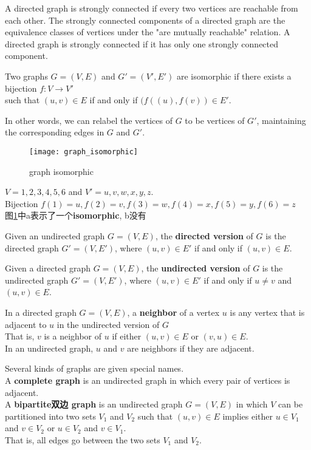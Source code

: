 \documentclass{article}
\begin{document}
A directed graph is strongly connected if every two vertices are reachable from each other. The strongly connected components of a directed graph are the equivalence classes of vertices under the "are mutually reachable" relation. A directed graph is strongly connected if it has only one strongly connected component.

Two graphs $G = (V, E)$ and $G' = (V', E')$ are isomorphic if there exists a bijection $f : V \rightarrow V'$ \\
such that $(u, v) \in E$ if and only if $(f((u), f(v)) \in E'$.

In other words, we can relabel the vertices of $G$ to be vertices of $G'$, maintaining the corresponding edges in $G$ and $G'$.

\begin{figure}[htbp]
   \centering
   \texttt{[image: graph\_isomorphic]}\\
   \caption{graph isomorphic}\label{fig.graph.isomorphic}
 \end{figure}

$V = {1, 2, 3, 4, 5, 6}$ and $V' = {u, v, w, x, y, z}$. \\
Bijection $f(1) = u, f(2) = v, f(3) = w, f(4) = x, f(5) = y, f(6) = z$\\
图\ref{fig.graph.isomorphic}中a表示了一个\textbf{isomorphic}, b没有

\bigskip
Given an undirected graph $G = (V, E)$, the \textbf{directed version} of $G$ is the directed graph $G' = (V, E')$, where $(u, v) \in E'$ if and only if $(u, v) \in E$.

Given a directed graph $G = (V, E)$, the \textbf{undirected version} of $G$ is the undirected graph $G'= (V, E')$, where $(u, v) \in E'$ if and only if $u \neq v$ and $(u, v) \in E$.

In a directed graph $G = (V, E)$, a \textbf{neighbor} of a vertex $u$ is any vertex that is adjacent to $u$ in the undirected version of $G$ \\
That is, $v$ is a neighbor of $u$ if either $(u, v) \in E$ or $(v, u) \in E$. \\
In an undirected graph, $u$ and $v$ are neighbors if they are adjacent.

\bigskip
Several kinds of graphs are given special names. \\
A \textbf{complete graph} is an undirected graph in which every pair of vertices is adjacent. \\
A \textbf{bipartite双边 graph} is an undirected graph $G = (V, E)$ in which $V$ can be partitioned into two sets $V_1$ and $V_2$ such that $(u, v) \in E$ implies either $u \in V_1$ and $v \in V_2$ or $u \in V_2$ and $v \in V_1$. \\
That is, all edges go between the two sets $V_1$ and $V_2$.
\end{document}

